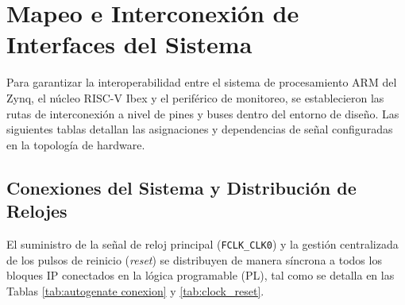 \section{Mapeo e Interconexión de Interfaces del Sistema}
Para garantizar la interoperabilidad entre el sistema de procesamiento ARM del Zynq, el núcleo RISC-V Ibex y el periférico de monitoreo, se establecieron las rutas de interconexión a nivel de pines y buses dentro del entorno de diseño. Las siguientes tablas detallan las asignaciones y dependencias de señal configuradas en la topología de hardware.

\subsection{Conexiones del Sistema y Distribución de Relojes}
El suministro de la señal de reloj principal (\texttt{FCLK\_CLK0}) y la gestión centralizada de los pulsos de reinicio (\textit{reset}) se distribuyen de manera síncrona a todos los bloques IP conectados en la lógica programable (PL), tal como se detalla en las Tablas \ref{tab:autogenate conexion} y \ref{tab:clock_reset}.

